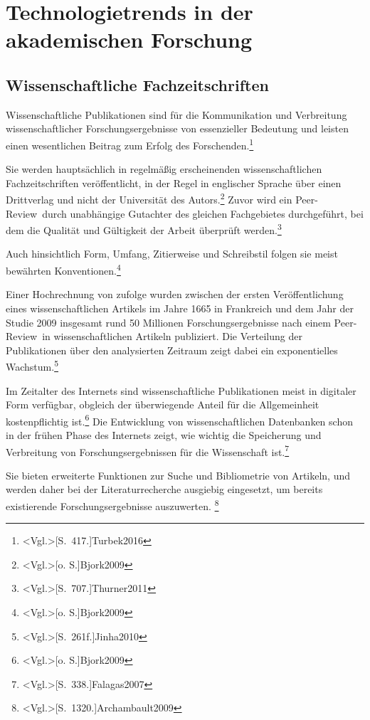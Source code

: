 \section{Technologietrends in der akademischen Forschung}
\subsection{Wissenschaftliche Fachzeitschriften}
Wissenschaftliche Publikationen sind für die Kommunikation und Verbreitung wissenschaftlicher Forschungsergebnisse von essenzieller Bedeutung und leisten einen wesentlichen Beitrag zum Erfolg des Forschenden.\footnote{\citeNP<Vgl.>[S.~417.]{Turbek2016}}

Sie werden hauptsächlich in regelmäßig erscheinenden wissenschaftlichen Fachzeitschriften veröffentlicht, in der Regel in englischer Sprache über einen Drittverlag und nicht der Universität des Autors.\footnote{\citeNP<Vgl.>[o. S.]{Bjork2009}} Zuvor wird ein \glqq Peer-Review\grqq~durch unabhängige Gutachter des gleichen Fachgebietes durchgeführt, bei dem die Qualität und Gültigkeit der Arbeit überprüft werden.\footnote{\citeNP<Vgl.>[S.~707.]{Thurner2011}}

Auch hinsichtlich Form, Umfang, Zitierweise und Schreibstil folgen sie meist bewährten Konventionen.\footnote{\citeNP<Vgl.>[o. S.]{Bjork2009}}

Einer Hochrechnung von  zufolge wurden zwischen der ersten Veröffentlichung eines wissenschaftlichen Artikels im Jahre 1665 in Frankreich und dem Jahr der Studie 2009 insgesamt rund 50 Millionen Forschungsergebnisse nach einem \glqq Peer-Review\grqq~in wissenschaftlichen Artikeln publiziert. Die Verteilung der Publikationen über den analysierten Zeitraum zeigt dabei ein exponentielles Wachstum.\footnote{\citeNP<Vgl.>[S.~261f.]{Jinha2010}}

Im Zeitalter des Internets sind wissenschaftliche Publikationen meist in digitaler Form verfügbar, obgleich der überwiegende Anteil für die Allgemeinheit kostenpflichtig ist.\footnote{\citeNP<Vgl.>[o. S.]{Bjork2009}} Die Entwicklung von wissenschaftlichen Datenbanken schon in der frühen Phase des Internets zeigt, wie wichtig die Speicherung und Verbreitung von Forschungsergebnissen für die Wissenschaft ist.\footnote{\citeNP<Vgl.>[S.~338.]{Falagas2007}}

Sie bieten erweiterte Funktionen zur Suche und Bibliometrie von Artikeln, und werden daher bei der Literaturrecherche ausgiebig eingesetzt, um bereits existierende Forschungsergebnisse auszuwerten. \footnote{\citeNP<Vgl.>[S.~1320.]{Archambault2009}}

